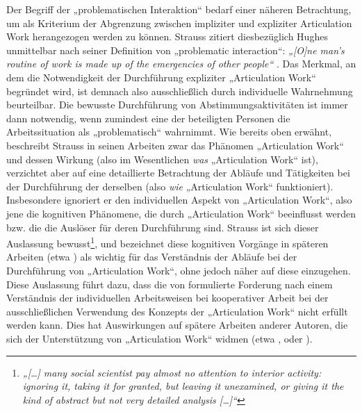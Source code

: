 Der Begriff der „problematischen Interaktion“ bedarf einer näheren Betrachtung, um als Kriterium der Abgrenzung zwischen impliziter und expliziter Articulation Work herangezogen werden zu können. Strauss zitiert diesbezüglich Hughes unmittelbar nach seiner Definition von „problematic interaction“: \emph{„[O]ne man's routine of work is made up of the emergencies of other people“} \citep[][zitiert nach \citep{Strauss93}]{Hughes71}. Das Merkmal, an dem die Notwendigkeit der Durchführung expliziter „Articulation Work“ begründet wird, ist demnach also ausschließlich durch individuelle Wahrnehmung beurteilbar. Die bewusste Durchführung von Abstimmungsaktivitäten ist immer dann notwendig, wenn zumindest eine der beteiligten Personen die Arbeitssituation als „problematisch“ wahrnimmt. Wie bereits oben erwähnt, beschreibt Strauss in seinen Arbeiten zwar das Phänomen „Articulation Work“ und dessen Wirkung (also im Wesentlichen \emph{was} „Articulation Work“ ist), verzichtet aber auf eine detaillierte Betrachtung der Abläufe und Tätigkeiten bei der Durchführung der derselben (also \emph{wie} „Articulation Work“ funktioniert). Insbesondere ignoriert er den individuellen Aspekt von „Articulation Work“, also jene die kognitiven Phänomene, die durch „Articulation Work“ beeinflusst werden bzw. die die Auslöser für deren Durchführung sind. Strauss ist sich dieser Auslassung bewusst\footnote{\emph{„[\ldots] many social scientist pay almost no attention to interior activity: ignoring it, taking it for granted, but leaving it unexamined, or giving it the kind of abstract but not very detailed analysis [\ldots]“}\citep[][S. 131]{Strauss93}}, und bezeichnet diese kognitiven Vorgänge in späteren Arbeiten (etwa \citep{Strauss93})  als wichtig für das Verständnis der Abläufe bei der Durchführung von „Articulation Work“, ohne jedoch näher auf diese einzugehen. Diese Auslassung führt dazu, dass die von \citet{Grudin88} formulierte Forderung nach einem Verständnis der individuellen Arbeitsweisen bei kooperativer Arbeit bei der ausschließlichen Verwendung des Konzepts der „Articulation Work“ nicht erfüllt werden kann. Dies hat Auswirkungen auf spätere Arbeiten anderer Autoren, die sich der Unterstützung von „Articulation Work“ widmen (etwa \citet{Schmidt92}, \citet{Simone99} oder \citet{Baker07}).


